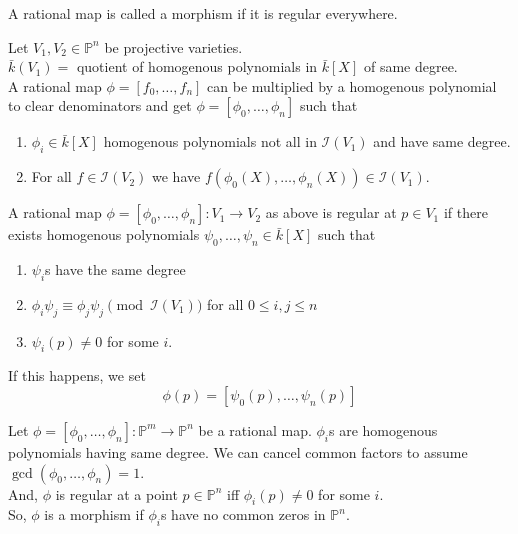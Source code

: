 \documentclass[oneside, 12pt, ]{scrbook}
\newcommand{\I}{\mathcal{I}}
\newcommand{\PP}{\mathbb{P}}
\theoremstyle{theorem}
\begin{document}
\begin{definition}
A rational map is called a morphism if it is regular everywhere.
\end{definition}

\begin{remark}
Let $V_{1},V_{2} \in \PP^n$ be projective varieties. \\
$\bar{k}(V_{1}) = $ quotient of homogenous polynomials in $\bar{k}[X]$ of same degree.\\ 
A rational map $\phi = [f_{0}, \hdots , f_{n}]$ can be multiplied by a homogenous polynomial to clear denominators and get $\phi = [\phi_{0} , \hdots ,  \phi_{n}]$ such that 
\begin{enumerate}
\item $\phi_{i} \in \bar{k}[X]$ homogenous polynomials not all in $\I(V_{1})$ and have same degree.
\item For all $f \in \I(V_{2})$ we have $f(\phi_{0}(X), \hdots , \phi_{n}(X)) \in \I(V_{1})$. 
\end{enumerate}
\end{remark}

\begin{definition}
A rational map $\phi = [\phi_{0} , \hdots , \phi_{n}]: V_{1} \rightarrow V_{2}$ as  above is regular at $p \in V_{1}$ if there exists homogenous polynomials $\psi_{0},\hdots , \psi_{n} \in \bar{k}[X]$ such that 
\begin{enumerate}
\item $\psi_{i}$s have the same degree 
\item $\phi_{i}\psi_{j} \equiv \phi_{j}\psi_{j} \pmod{\I(V_{1})}$ for all $0  \le i,j \le n$
\item $\psi_{i}(p) \neq 0$ for some $i$.
\end{enumerate}
If this happens, we set $$\phi(p) = [\psi_{0}(p), \hdots , \psi_{n}(p)]$$
\end{definition}

\begin{remark}
Let $\phi= [\phi_{0}, \hdots , \phi_{n}]: \PP^m \rightarrow \PP^n$ be a rational map. $\phi_{i}$s are homogenous polynomials having same degree. We can cancel common factors to assume $\gcd(\phi_{0} , \hdots , \phi_{n})=1$. \\

And, $\phi$ is regular at a point $p \in \PP^n$ iff $\phi_{i}(p) \neq 0$ for some $i$.  \\
So, $\phi$ is a morphism if $\phi_{i}$s have no common zeros in $\PP^n$. 
\end{remark}
\end{document}
